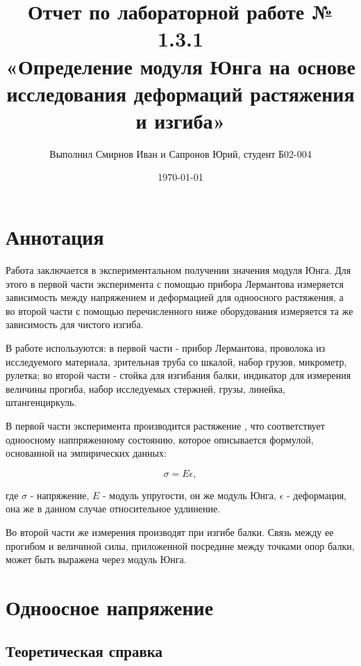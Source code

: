 \documentclass[a4paper,12pt]{report}
\author{Выполнил Смирнов Иван и Сапронов Юрий, студент Б02-004}
\title{Отчет по лабораторной работе № 1.3.1 \\[15pt] «Определение модуля Юнга на основе исследования деформаций растяжения и изгиба»}
\date{\today}
\begin{document}
\maketitle

\section*{\Large Аннотация}

Работа заключается в экспериментальном получении значения модуля Юнга. Для этого в первой части эксперимента с помощью прибора Лермантова измеряется зависимость между напряжением и деформацией для одноосного растяжения, а во второй части с помощью перечисленного ниже оборудования измеряется та же зависимость для чистого изгиба.

В работе используются: в первой части - прибор Лермантова, проволока из исследуемого материала, зрительная труба со шкалой, набор грузов, микрометр, рулетка; во второй части - стойка для изгибания балки, индикатор для измерения величины прогиба, набор исследуемых стержней, грузы, линейка, штангенциркуль.

В первой части эксперимента производится растяжение 
, что соответствует одноосному наппряженному состоянию, которое описывается формулой, основанной на эмпирических данных:

\begin{equation}
	\sigma = E \epsilon ,
\end{equation}

где $\sigma$ - напряжение, $E$ - модуль упругости, он же модуль Юнга, $\epsilon$ - деформация, она же в данном случае относительное удлинение.

Во второй части же измерения производят при изгибе балки. Связь между ее прогибом и величиной силы, приложенной посредине между точками опор балки, может быть выражена через модуль Юнга. 



\section*{\Large Одноосное напряжение}



\subsection*{Теоретическая справка}
\end{document}
